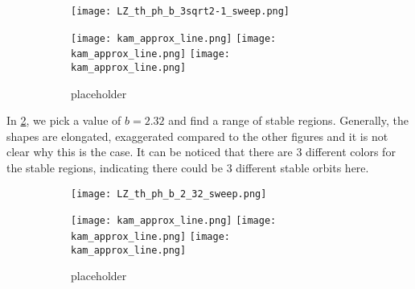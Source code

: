 \begin{figure}[!th]
\centering
\hfill
\begin{subfigure}[h]{0.49\textwidth}
\centering
\texttt{[image: LZ\_th\_ph\_b\_3sqrt2-1\_sweep.png]}
\caption{}
\label{subfig:LZpoincaresectionb1242}
\end{subfigure}
%
\hfill
\begin{subfigure}[h]{0.49\textwidth}
\centering
\texttt{[image: kam\_approx\_line.png]}
%
\texttt{[image: kam\_approx\_line.png]}
%
\texttt{[image: kam\_approx\_line.png]}
\caption{placeholder}
\end{subfigure}
\hfill
\caption{}
\end{figure}

In \cref{subfig:LZpoincaresectionb232}, we pick a value of $b=2.32$ and find a range of stable regions. Generally, the shapes are elongated, exaggerated compared to the other figures and it is not clear why this is the case. It can be noticed that there are 3 different colors for the stable regions, indicating there could be 3 different stable orbits here.

\begin{figure}[!th]
\centering
\hfill
\begin{subfigure}[h]{0.49\textwidth}
\centering
\texttt{[image: LZ\_th\_ph\_b\_2\_32\_sweep.png]}
\caption{}
\label{subfig:LZpoincaresectionb232}
\end{subfigure}
%
\hfill
\begin{subfigure}[h]{0.49\textwidth}
\centering
\texttt{[image: kam\_approx\_line.png]}
%
\texttt{[image: kam\_approx\_line.png]}
%
\texttt{[image: kam\_approx\_line.png]}
\caption{placeholder}
\end{subfigure}
\hfill
\caption{}
\end{figure}